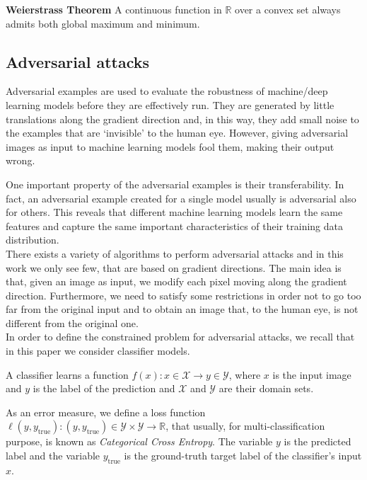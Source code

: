 \documentclass[10pt,twocolumn,letterpaper, english]{article}
\theoremstyle{definition}
\theoremstyle{plain}
\theoremstyle{plain}
\theoremstyle{plain}
\theoremstyle{plain}
\theoremstyle{remark}
\theoremstyle{remark}
\theoremstyle{definition}
\theoremstyle{definition}
\theoremstyle{definition}
\theoremstyle{definition}
\begin{document}
\textbf{Weierstrass Theorem} A continuous function in $\mathbb{R}$ over a convex set always admits both global maximum and minimum.

\subsection{Adversarial attacks}

Adversarial examples are used to evaluate the robustness of machine/deep learning models before they are effectively run. 
They are generated by little translations along the gradient direction and, in this way, they add small noise to the examples that are ‘invisible’ to the human eye. 
However, giving adversarial images as input to machine learning models fool them, making their output wrong.

One important property of the adversarial examples is their transferability. 
In fact, an adversarial example created for a single model usually is adversarial also for others. 
This reveals that different machine learning models learn the same features and capture the same important characteristics of their training data distribution. \\ 

There exists a variety of algorithms to perform adversarial attacks and in this work we only see few, that are based on gradient directions. 
The main idea is that, given an image as input, we modify each pixel moving along the gradient direction. 
Furthermore, we need to satisfy some restrictions in order not to go too far from the original input and to obtain an image that, to the human eye, is not different from the original one. \\

In order to define the constrained problem for adversarial attacks, we recall that in this paper we consider classifier models. 

A classifier learns a function $f(x): x \in \mathcal{X} \to y \in \mathcal{Y}$, where $x$ is the input image and $y$ is the label of the prediction and $\mathcal{X}$ and $\mathcal{Y}$ are their domain sets. 

As an error measure, we define a loss function $\ell(y, y_{\text{true}}): (y,y_{\text{true}}) \in \mathcal{Y} \times \mathcal{Y} \to \mathbb{R} $, that usually, for multi-classification purpose, is known as \textit{Categorical Cross Entropy}. 
The variable $y$ is the predicted label and the variable $y_{\text{true}}$ is the ground-truth target label of the classifier's input $x$. \\  
\end{document}
